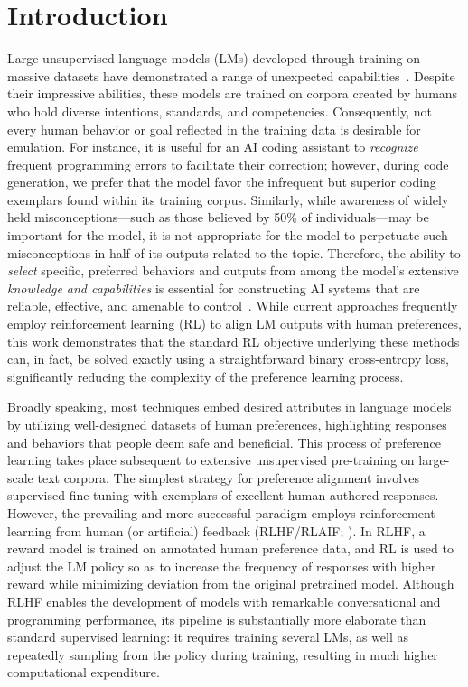 \section{Introduction}
Large unsupervised language models (LMs) developed through training on massive datasets have demonstrated a range of unexpected capabilities~\citep{chowdhery2022palm, brown2020language, touvron2023llama,bubeck2023sparks}. Despite their impressive abilities, these models are trained on corpora created by humans who hold diverse intentions, standards, and competencies. Consequently, not every human behavior or goal reflected in the training data is desirable for emulation. For instance, it is useful for an AI coding assistant to \textit{recognize} frequent programming errors to facilitate their correction; however, during code generation, we prefer that the model favor the infrequent but superior coding exemplars found within its training corpus. Similarly, while awareness of widely held misconceptions—such as those believed by 50\% of individuals—may be important for the model, it is not appropriate for the model to perpetuate such misconceptions in half of its outputs related to the topic. Therefore, the ability to \emph{select} specific, preferred behaviors and outputs from among the model's extensive \textit{knowledge and capabilities} is essential for constructing AI systems that are reliable, effective, and amenable to control~\citep{ouyang2022training}. While current approaches frequently employ reinforcement learning (RL) to align LM outputs with human preferences, this work demonstrates that the standard RL objective underlying these methods can, in fact, be solved exactly using a straightforward binary cross-entropy loss, significantly reducing the complexity of the preference learning process.

Broadly speaking, most techniques embed desired attributes in language models by utilizing well-designed datasets of human preferences, highlighting responses and behaviors that people deem safe and beneficial. This process of preference learning takes place subsequent to extensive unsupervised pre-training on large-scale text corpora. The simplest strategy for preference alignment involves supervised fine-tuning with exemplars of excellent human-authored responses. However, the prevailing and more successful paradigm employs reinforcement learning from human (or artificial) feedback (RLHF/RLAIF; \citep{christiano2017deep,bai2022constitutional}). In RLHF, a reward model is trained on annotated human preference data, and RL is used to adjust the LM policy so as to increase the frequency of responses with higher reward while minimizing deviation from the original pretrained model. Although RLHF enables the development of models with remarkable conversational and programming performance, its pipeline is substantially more elaborate than standard supervised learning: it requires training several LMs, as well as repeatedly sampling from the policy during training, resulting in much higher computational expenditure.

